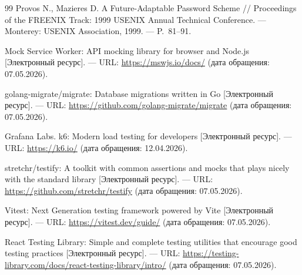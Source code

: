 \begin{thebibliography}{99}
      Provos N., Mazieres D.
      A Future-Adaptable Password Scheme //
      Proceedings of the FREENIX Track: 1999 USENIX Annual Technical Conference. ---
      Monterey: USENIX Association, 1999. --- P.~81--91.

      

      Mock Service Worker: API mocking library for browser and Node.js
      [Электронный ресурс]. ---
      URL: \url{https://mswjs.io/docs/} (дата обращения: 07.05.2026).

      

      golang-migrate/migrate: Database migrations written in Go
      [Электронный ресурс]. ---
      URL: \url{https://github.com/golang-migrate/migrate} (дата обращения: 07.05.2026).

      

      Grafana Labs.
      k6: Modern load testing for developers [Электронный ресурс]. ---
      URL: \url{https://k6.io/} (дата обращения: 12.04.2026).

      

      stretchr/testify: A toolkit with common assertions and mocks
      that plays nicely with the standard library [Электронный ресурс]. ---
      URL: \url{https://github.com/stretchr/testify} (дата обращения: 07.05.2026).

      

      Vitest: Next Generation testing framework powered by Vite
      [Электронный ресурс]. ---
      URL: \url{https://vitest.dev/guide/} (дата обращения: 07.05.2026).

      

      React Testing Library: Simple and complete testing utilities
      that encourage good testing practices [Электронный ресурс]. ---
      URL: \url{https://testing-library.com/docs/react-testing-library/intro/} (дата обращения: 07.05.2026).

      

\end{thebibliography}


